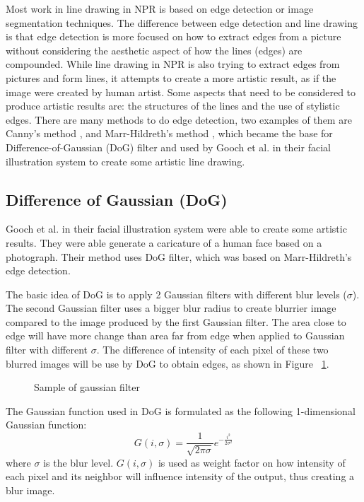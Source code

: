 Most work in line drawing in NPR is based on edge detection or image segmentation techniques. The difference between edge detection and line drawing is that edge detection is more focused on how to extract edges from a picture without considering the aesthetic aspect of how the lines (edges) are compounded. While line drawing in NPR is also trying to extract edges from pictures and form lines, it attempts to create a more artistic result, as if the image were created by human artist. Some aspects that need to be considered to produce artistic results are: the structures of the lines and the use of stylistic edges. There are many methods to do edge detection, two examples of them are Canny's method \cite{canny86}, and Marr-Hildreth's method \cite{marr-hildreth80}, which became the base for Difference-of-Gaussian (DoG) filter and used by Gooch et al. in their facial illustration system to create some artistic line drawing.

\subsection{Difference of Gaussian (DoG)} 
Gooch et al. in their facial illustration system \cite{gooch04} were able to create some artistic results. They were able generate a caricature of a human face based on a photograph. Their method uses DoG filter, which was based on Marr-Hildreth's edge detection.

The basic idea of DoG is to apply 2 Gaussian filters with different blur levels ($\sigma$). The second Gaussian filter uses a bigger blur radius to create blurrier image compared to the image produced by the first Gaussian filter. The area close to edge will have more change than area far from edge when applied to Gaussian filter with different $\sigma$. The difference of intensity of each pixel of these two blurred images will be use by DoG to obtain edges, as shown in Figure ~\ref{fig:DoG_sample1}.

\begin{figure}[H]
\centering
\caption{Sample of gaussian filter}
\label{fig:DoG_sample1}
\end{figure}

The Gaussian function used in DoG is formulated as the following 1-dimensional Gaussian function:
\begin{equation}
	G(i, \sigma) = \frac{1}{\sqrt{2\pi\sigma}}e^{-\frac{i^2}{2\sigma^2}}
\end{equation}
where $\sigma$ is the blur level. $G(i, \sigma)$ is used as weight factor on how intensity of each pixel and its neighbor will influence intensity of the output, thus creating a blur image. 

